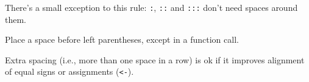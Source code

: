 \begin{Shaded}
\begin{Highlighting}[]
\StringTok{ }\StringTok{ } \NormalTok{+}\StringTok{ } \NormalTok{)}

\NormalTok{)}
\end{Highlighting}
\end{Shaded}

There's a small exception to this rule: \texttt{:}, \texttt{::} and
\texttt{:::} don't need spaces around them.

\begin{Shaded}
\begin{Highlighting}[]
\StringTok{ }\NormalTok{:}

\StringTok{ } \NormalTok{:}\StringTok{ }
\StringTok{ }
\end{Highlighting}
\end{Shaded}

Place a space before left parentheses, except in a function call.

\begin{Shaded}
\begin{Highlighting}[]

 
\end{Highlighting}
\end{Shaded}

Extra spacing (i.e., more than one space in a row) is ok if it improves
alignment of equal signs or assignments (\texttt{\textless{}-}).

\begin{Shaded}
\begin{Highlighting}[]
\NormalTok{(}
   \StringTok{ }\StringTok{ }
   \StringTok{ }\StringTok{ }\StringTok{ }
\NormalTok{)}
\end{Highlighting}
\end{Shaded}

